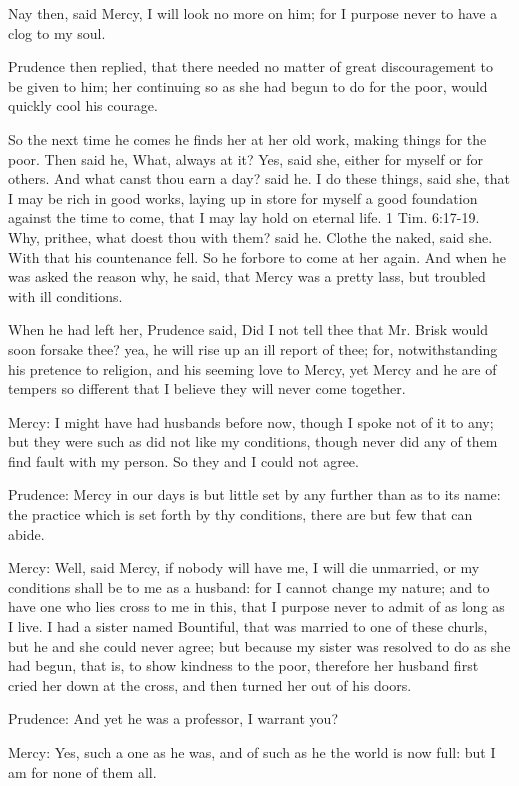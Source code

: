 Nay then, said Mercy, I will look no more on him; for I purpose never to have a clog to my soul.

Prudence then replied, that there needed no matter of great discouragement to be given to him; her continuing so as she had begun to do for the poor, would quickly cool his courage.

So the next time he comes he finds her at her old work, making things for the poor. Then said he, What, always at it? Yes, said she, either for myself or for others. And what canst thou earn a day? said he. I do these things, said she, that I may be rich in good works, laying up in store for myself a good foundation against the time to come, that I may lay hold on eternal life. 1 Tim. 6:17-19. Why, prithee, what doest thou with them? said he. Clothe the naked, said she. With that his countenance fell. So he forbore to come at her again. And when he was asked the reason why, he said, that Mercy was a pretty lass, but troubled with ill conditions.

When he had left her, Prudence said, Did I not tell thee that Mr. Brisk would soon forsake thee? yea, he will rise up an ill report of thee; for, notwithstanding his pretence to religion, and his seeming love to Mercy, yet Mercy and he are of tempers so different that I believe they will never come together.

Mercy: I might have had husbands before now, though I spoke not of it to any; but they were such as did not like my conditions, though never did any of them find fault with my person. So they and I could not agree.

Prudence: Mercy in our days is but little set by any further than as to its name: the practice which is set forth by thy conditions, there are but few that can abide.

Mercy: Well, said Mercy, if nobody will have me, I will die unmarried, or my conditions shall be to me as a husband: for I cannot change my nature; and to have one who lies cross to me in this, that I purpose never to admit of as long as I live. I had a sister named Bountiful, that was married to one of these churls, but he and she could never agree; but because my sister was resolved to do as she had begun, that is, to show kindness to the poor, therefore her husband first cried her down at the cross, and then turned her out of his doors.

Prudence: And yet he was a professor, I warrant you?

Mercy: Yes, such a one as he was, and of such as he the world is now full: but I am for none of them all.

